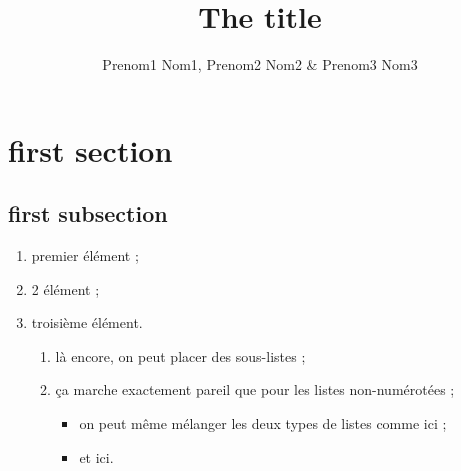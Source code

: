 \documentclass[french]{VGReport}
\title{The title}
\author{
    Prenom1 Nom1,
    Prenom2 Nom2 \&
    Prenom3 Nom3
}
\begin{document}
\maketitle

\MyToc

\sloppy

\section{first section}
\subsection{first subsection}
\label{sec:first_subsection}

\begin{enumerate}
    \item premier élément ;
    \item 2 élément ;
    \item troisième élément.
    \begin{enumerate}
        \item là encore, on peut placer des sous-listes ;
        \item ça marche exactement pareil que pour les listes non-numérotées ;
        \begin{itemize}
            \item on peut même mélanger les deux types de listes comme ici ;
            \item et ici.
        \end{itemize}
    \end{enumerate}
\end{enumerate}
\end{document}
